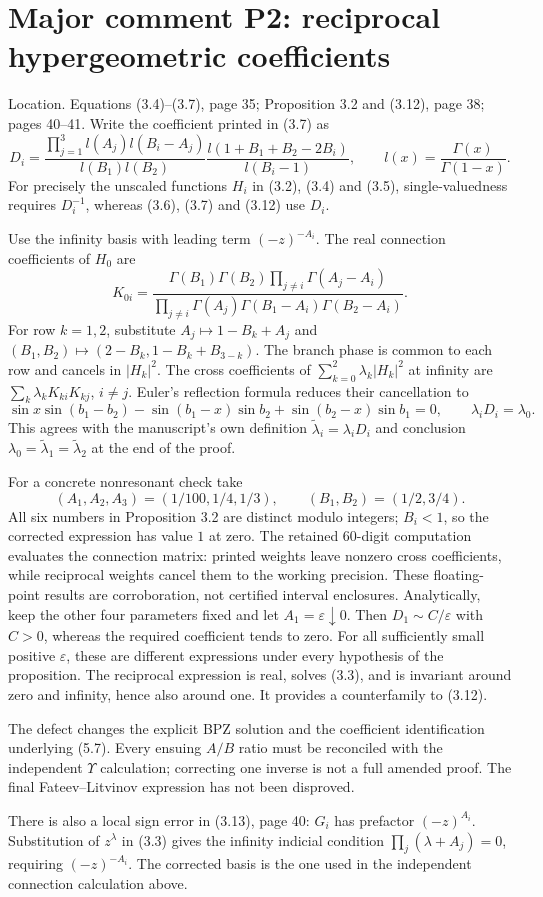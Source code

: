 \documentclass[10pt]{article}
\begin{document}
\section*{Major comment P2: reciprocal hypergeometric coefficients}
Location. Equations (3.4)–(3.7), page 35; Proposition 3.2 and (3.12), page 38; pages 40–41. Write the coefficient printed in (3.7) as \[D_i=
 \frac{\prod_{j=1}^3l(A_j)l(B_i-A_j)}{l(B_1)l(B_2)}
 \frac{l(1+B_1+B_2-2B_i)}{l(B_i-1)},\qquad
 l(x)=\frac{\Gamma(x)}{\Gamma(1-x)}.\] For precisely the unscaled functions \(H_i\) in (3.2), (3.4) and (3.5), single-valuedness requires \(D_i^{-1}\), whereas (3.6), (3.7) and (3.12) use \(D_i\).\par
Use the infinity basis with leading term \((-z)^{-A_i}\). The real connection coefficients of \(H_0\) are \[K_{0i}=
 \frac{\Gamma(B_1)\Gamma(B_2)\prod_{j\ne i}\Gamma(A_j-A_i)}
 {\prod_{j\ne i}\Gamma(A_j)\Gamma(B_1-A_i)\Gamma(B_2-A_i)}.\] For row \(k=1,2\), substitute \(A_j\mapsto1-B_k+A_j\) and \((B_1,B_2)\mapsto(2-B_k,1-B_k+B_{3-k})\). The branch phase is common to each row and cancels in \(|H_k|^2\). The cross coefficients of \(\sum_{k=0}^2\lambda_k|H_k|^2\) at infinity are \(\sum_k\lambda_kK_{ki}K_{kj}\), \(i\ne j\). Euler’s reflection formula reduces their cancellation to \[\sin x\sin(b_1-b_2)-\sin(b_1-x)\sin b_2
 +\sin(b_2-x)\sin b_1=0,
 \qquad \lambda_iD_i=\lambda_0.\] This agrees with the manuscript’s own definition \(\widetilde\lambda_i=\lambda_iD_i\) and conclusion \(\lambda_0=\widetilde\lambda_1=\widetilde\lambda_2\) at the end of the proof.\par
For a concrete nonresonant check take \[(A_1,A_2,A_3)=(1/100,1/4,1/3),\qquad
 (B_1,B_2)=(1/2,3/4).\] All six numbers in Proposition 3.2 are distinct modulo integers; \(B_i<1\), so the corrected expression has value \(1\) at zero. The retained 60-digit computation evaluates the connection matrix: printed weights leave nonzero cross coefficients, while reciprocal weights cancel them to the working precision. These floating-point results are corroboration, not certified interval enclosures. Analytically, keep the other four parameters fixed and let \(A_1=\varepsilon\downarrow0\). Then \(D_1\sim C/\varepsilon\) with \(C>0\), whereas the required coefficient tends to zero. For all sufficiently small positive \(\varepsilon\), these are different expressions under every hypothesis of the proposition. The reciprocal expression is real, solves (3.3), and is invariant around zero and infinity, hence also around one. It provides a counterfamily to (3.12).\par
The defect changes the explicit BPZ solution and the coefficient identification underlying (5.7). Every ensuing \(A/B\) ratio must be reconciled with the independent \(\Upsilon\) calculation; correcting one inverse is not a full amended proof. The final Fateev–Litvinov expression has not been disproved.\par
There is also a local sign error in (3.13), page 40: \(G_i\) has prefactor \((-z)^{A_i}\). Substitution of \(z^\lambda\) in (3.3) gives the infinity indicial condition \(\prod_j(\lambda+A_j)=0\), requiring \((-z)^{-A_i}\). The corrected basis is the one used in the independent connection calculation above.\par
\end{document}
